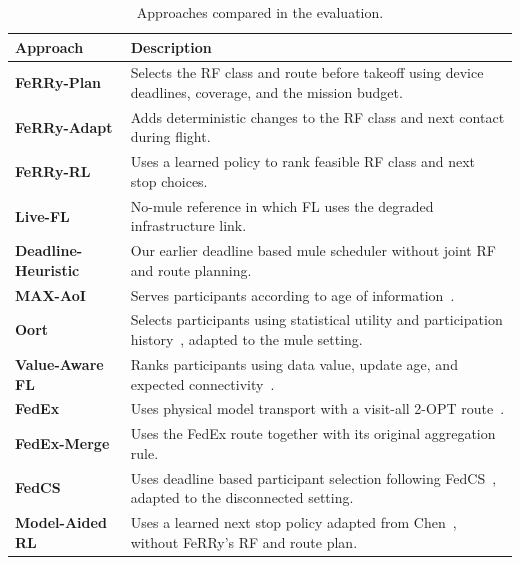 \documentclass[conference]{IEEEtran}
\newcommand{\sysname}{FeRRy}
\begin{document}
\begin{table}[t]
\centering
\caption{Approaches compared in the evaluation.}
\label{tab:arms}
\small
\begin{tabular}{p{} p{}}
\hline
\textbf{Approach} & \textbf{Description} \\
\hline

\textbf{\sysname{}-Plan} &
Selects the RF class and route before takeoff using device deadlines, coverage,
and the mission budget. \\

\textbf{\sysname{}-Adapt} &
Adds deterministic changes to the RF class and next contact during flight. \\

\textbf{\sysname{}-RL} &
Uses a learned policy to rank feasible RF class and next stop choices. \\

\textbf{Live-FL} &
No-mule reference in which FL uses the degraded infrastructure link. \\

\textbf{Deadline-Heuristic} &
Our earlier deadline based mule scheduler without joint RF and route planning. \\

\textbf{MAX-AoI} &
Serves participants according to age of information~\cite{kadota2018scheduling}. \\

\textbf{Oort} &
Selects participants using statistical utility and participation
history~\cite{lai2021oort}, adapted to the mule setting. \\

\textbf{Value-Aware FL} &
Ranks participants using data value, update age, and expected
connectivity~\cite{cui2023data}. \\

\textbf{FedEx} &
Uses physical model transport with a visit-all 2-OPT
route~\cite{bian2025indirect}. \\

\textbf{FedEx-Merge} &
Uses the FedEx route together with its original aggregation rule. \\

\textbf{FedCS} &
Uses deadline based participant selection following
FedCS~\cite{nishio2019client}, adapted to the disconnected setting. \\

\textbf{Model-Aided RL} &
Uses a learned next stop policy adapted from
Chen~\cite{chen2023model}, without FeRRy's RF and route plan. \\

\hline
\end{tabular}
\end{table}
\end{document}
